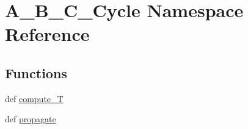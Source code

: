 \hypertarget{namespaceA__B__C__Cycle}{\section{A\+\_\+\+B\+\_\+\+C\+\_\+\+Cycle Namespace Reference}
\label{namespaceA__B__C__Cycle}
}
\subsection*{Functions}
\begin{DoxyCompactItemize}
\item 
def \hyperlink{namespaceA__B__C__Cycle_a5185de4b3f647f2c0fd827dc61787e74}{compute\+\_\+\+T}
\item 
def \hyperlink{namespaceA__B__C__Cycle_a59ce12842045f3ad4619feb145abdcf8}{propagate}
\end{DoxyCompactItemize}
